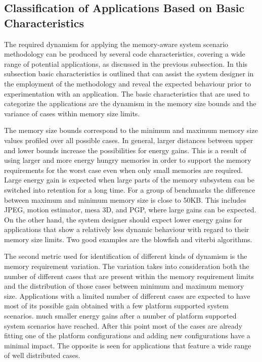 \documentclass{acm_proc_article-sp}
\begin{document}
\subsection{Classification of Applications Based on Basic Characteristics}
\label{sec:categorisation}
The required dynamism for applying the memory-aware system scenario methodology can be produced by several code characteristics, covering a wide range of potential applications, as discussed in the previous subsection. In this subsection basic characteristics is outlined that can assist the system designer in the employment of the methodology and reveal the expected behaviour prior to experimentation with an application. The basic characteristics that are used to categorize the applications are the dynamism in the memory size bounds and the variance of cases within memory size limits.

The memory size bounds correspond to the minimum and maximum memory size values profiled over all possible cases. In general, larger distances between upper and lower bounds increase the possibilities for energy gains. This is a result of using larger and more energy hungry memories in order to support the memory requirements for the worst case even when only small memories are required. Large energy gain is expected when large parts of the memory subsystem can be switched into retention for a long time. For a group of benchmarks the difference between maximum and minimum memory size is close to 50KB. This includes JPEG, motion estimator, mesa 3D, and PGP, where large gains can be expected. On the other hand, the system designer should expect lower energy gains for applications that show a relatively less dynamic behaviour with regard to their memory size limits. Two good examples are the blowfish and viterbi algorithms. 

The second metric used for identification of different kinds of dynamism is the memory requirement variation. The variation takes into consideration both the number of different cases that are present within the memory requirement limits and the distribution of those cases between minimum and maximum memory size. Applications with a limited number of different cases are expected to have most of its possible gain obtained with a few platform supported system scenarios. much smaller energy gains after a number of platform supported system scenarios have reached. After this point most of the cases are already fitting one of the platform configurations and adding new configurations have a minimal impact. The opposite is seen for applications that feature a wide range of well distributed cases.
\end{document}
